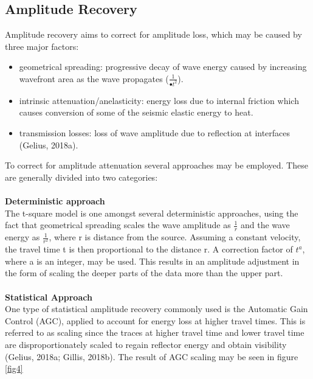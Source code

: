 \documentclass[10pt,a4paper]{article}
\begin{document}
\subsection{Amplitude Recovery}

Amplitude recovery aims to correct for amplitude loss, which may be caused by three major factors:

\begin{itemize}
    \item geometrical spreading: progressive decay of wave energy caused by increasing wavefront area as the wave propagates ($\frac{1}{•t^2}$).
    \item intrinsic attenuation/anelasticity: energy loss due to internal friction which causes conversion of some of the seismic elastic energy to heat.
    \item transmission losses: loss of wave amplitude due to reflection at interfaces (Gelius, 2018a).
\end{itemize}

\noindent To correct for amplitude attenuation several approaches may be employed. These are generally divided into two categories:
\\
\\
{\bf Deterministic approach}
\\
The t-square model is one amongst several deterministic approaches, using the fact that geometrical spreading scales the wave amplitude as $\frac{1}{r}$ and the wave energy as $\frac{1}{r^2}$, where r is distance from the source. Assuming a constant velocity, the travel time t is then proportional to the distance r. A correction factor of $t^a$, where a is an integer, may be used. This results in an amplitude adjustment in the form of scaling the deeper parts of the data more than the upper part.
\\
\\
{\bf Statistical Approach}
\\
One type of statistical amplitude recovery commonly used is the Automatic Gain Control (AGC), applied to account for energy loss at higher travel times. This is referred to as scaling since the traces at higher travel time and lower travel time are disproportionately scaled to regain reflector energy and obtain visibility (Gelius, 2018a; Gillis, 2018b). The result of AGC scaling may be seen in figure \ref{fig4}
\end{document}
